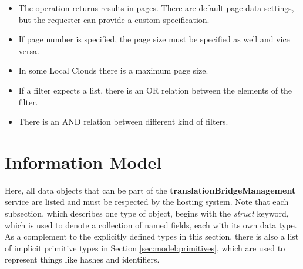 \documentclass[a4paper]{arrowhead}
\begin{document}
\begin{itemize}
    \item The operation returns results in pages. There are default page data settings, but the requester can provide a custom specification.
    \item If page number is specified, the page size must be specified as well and vice versa.
    \item In some Local Clouds there is a maximum page size.
    \item If a filter expects a list, there is an OR relation between the elements of the filter.
    \item There is an AND relation between different kind of filters.
\end{itemize}

\clearpage

\section{Information Model}
\label{sec:model}

Here, all data objects that can be part of the \textbf{translationBridgeManagement} service are listed and must be respected by the hosting system.
Note that each subsection, which describes one type of object, begins with the \textit{struct} keyword, which is used to denote a collection of named fields, each with its own data type.
As a complement to the explicitly defined types in this section, there is also a list of implicit primitive types in Section \ref{sec:model:primitives}, which are used to represent things like hashes and identifiers.

{}
 
\end{document}

